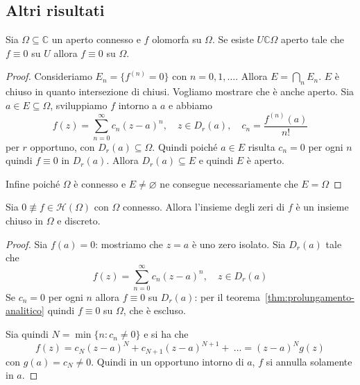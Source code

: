 \subsection{Altri risultati}

\begin{theorem}\label{thm:prolungamento-analitico}
    Sia \(\Omega \subseteq \mathbb{C} \) un aperto connesso e \(f\) olomorfa su
    \(\Omega\). Se esiste \(U \mathbb{C} \Omega\) aperto tale che \(f \equiv 0\)
    su \(U\) allora \(f \equiv 0\) su \(\Omega\).
\end{theorem}
\begin{proof}
    Consideriamo \(E_{n} = \{f^{{(n)}} = 0\} \) con \(n = 0, 1, \dots\). Allora
    \(E = \bigcap_{n} E_{n}\). \(E\) è chiuso in quanto intersezione di chiusi.
    Vogliamo mostrare che è anche aperto. Sia \(a \in E \subseteq \Omega \),
    sviluppiamo \(f\)  intorno a \(a\) e abbiamo
    \[
      f{(z)} = \sum_{n=0}^{\infty} c_{n} {(z-a)}^{n}, \quad z \in D_r{(a)}, \quad
      c_{n} = \frac{f^{{(n)}}{(a)}}{n!}
    \]
    per \(r\) opportuno, con \(D_r{(a)} \subseteq \Omega \). Quindi poiché \(a
    \in E\) risulta \(c_{n}=0\) per ogni \(n\) quindi \(f \equiv 0\) in
    \(D_r{(a)}\). Allora \(D_r{(a)} \subseteq E\) e quindi \(E\) è aperto.

    Infine poiché \(\Omega\) è connesso e \(E \neq \varnothing\) ne consegue
    necessariamente che \(E = \Omega\) 
\end{proof}
\begin{corollary}\label{cor:zero-isolato}
    Sia \(0 \not\equiv f \in \mathcal{H}{(\Omega)}\) con \(\Omega\) connesso. Allora l'insieme
    degli zeri di \(f\) è un insieme chiuso in \(\Omega\) e discreto.
\end{corollary}
\begin{proof}
    Sia \(f{(a)} = 0\): mostriamo che \(z = a\) è uno zero isolato. Sia
    \(D_r{(a)}\) tale che
    \[
      f{(z)} = \sum_{n=0}^{\infty} c_{n} {(z-a)}^{n}, \quad z \in D_r{(a)} 
    \]
    Se \(c_{n} = 0\) per ogni \(n\) allora \(f\equiv 0\) su \(D_r{(a)}\): per il
    teorema~\ref{thm:prolungamento-analitico} quindi \(f \equiv 0\) su \(\Omega\), che è escluso.

    Sia quindi \(N = \min \{ n : c_{n} \neq 0\} \) e si ha che
    \[
        f{(z)} = c_N {(z-a)}^{N} + c_{N+1} {(z-a)}^{N+1} +~\dots = {(z-a)}^{N}
        g{(z)}
    \]
    con \(g{(a)} = c_N \neq 0\). Quindi in un opportuno intorno di \(a\), \(f\)
    si annulla solamente in \(a\).
\end{proof}
